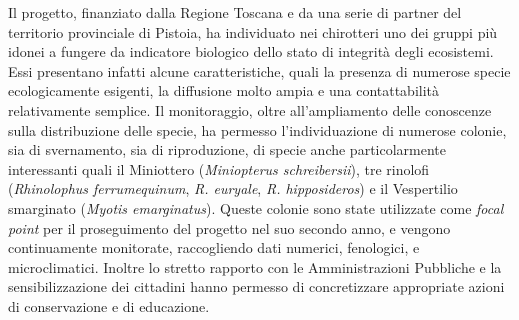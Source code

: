 {Il progetto, finanziato dalla Regione Toscana e da una serie di partner del territorio provinciale di Pistoia, ha individuato nei chirotteri uno dei gruppi più idonei a fungere da indicatore biologico dello stato di integrità degli ecosistemi. Essi presentano infatti alcune caratteristiche, quali la presenza di numerose specie ecologicamente esigenti, la diffusione molto ampia e  una contattabilità relativamente semplice. Il monitoraggio, oltre all’ampliamento delle conoscenze sulla distribuzione delle specie, ha permesso l’individuazione di numerose colonie, sia di svernamento, sia di riproduzione, di specie anche particolarmente interessanti quali il Miniottero (\emph{Miniopterus schreibersii}), tre rinolofi (\emph{Rhinolophus ferrumequinum}, \emph{R. euryale}, \emph{R. hipposideros})  e il Vespertilio smarginato (\emph{Myotis emarginatus}). Queste colonie sono state utilizzate come \textit{focal point} per il proseguimento del progetto nel suo secondo anno, e vengono continuamente monitorate, raccogliendo dati numerici, fenologici, e microclimatici. Inoltre lo stretto rapporto con le Amministrazioni Pubbliche e la sensibilizzazione dei cittadini hanno permesso di concretizzare appropriate azioni di conservazione e di educazione.
} %